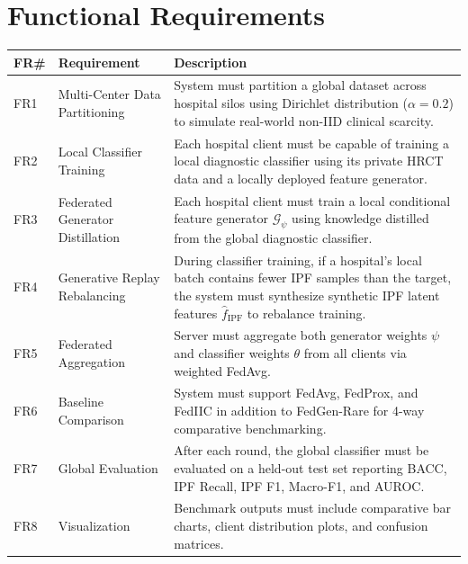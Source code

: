 \documentclass[12pt,a4paper]{report}
\begin{document}
\section{Functional Requirements}
\begin{longtable}{|p{0.5cm}|p{5cm}|p{8cm}|}
    \hline
    \textbf{FR\#} & \textbf{Requirement} & \textbf{Description} \\
    \hline
    FR1 & Multi-Center Data Partitioning & System must partition a global dataset across hospital silos using Dirichlet distribution ($\alpha=0.2$) to simulate real-world non-IID clinical scarcity. \\
    \hline
    FR2 & Local Classifier Training & Each hospital client must be capable of training a local diagnostic classifier using its private HRCT data and a locally deployed feature generator. \\
    \hline
    FR3 & Federated Generator Distillation & Each hospital client must train a local conditional feature generator $\mathcal{G}_\psi$ using knowledge distilled from the global diagnostic classifier. \\
    \hline
    FR4 & Generative Replay Rebalancing & During classifier training, if a hospital's local batch contains fewer IPF samples than the target, the system must synthesize synthetic IPF latent features $\hat{f}_\text{IPF}$ to rebalance training. \\
    \hline
    FR5 & Federated Aggregation & Server must aggregate both generator weights $\psi$ and classifier weights $\theta$ from all clients via weighted FedAvg. \\
    \hline
    FR6 & Baseline Comparison & System must support FedAvg, FedProx, and FedIIC in addition to FedGen-Rare for 4-way comparative benchmarking. \\
    \hline
    FR7 & Global Evaluation & After each round, the global classifier must be evaluated on a held-out test set reporting BACC, IPF Recall, IPF F1, Macro-F1, and AUROC. \\
    \hline
    FR8 & Visualization & Benchmark outputs must include comparative bar charts, client distribution plots, and confusion matrices. \\
    \hline
\end{longtable}
\end{document}
